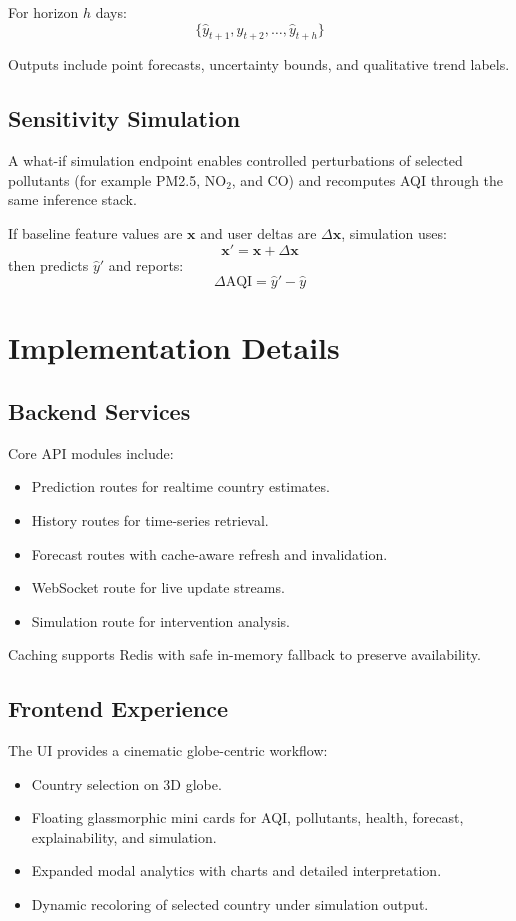 \documentclass[12pt,a4paper]{article}
\begin{document}
For horizon $h$ days:
\begin{equation}
\{\hat{y}_{t+1}, \hat{y}_{t+2}, \dots, \hat{y}_{t+h}\}
\end{equation}

Outputs include point forecasts, uncertainty bounds, and qualitative trend labels.

\subsection{Sensitivity Simulation}
A what-if simulation endpoint enables controlled perturbations of selected pollutants (for example PM2.5, NO$_2$, and CO) and recomputes AQI through the same inference stack.

If baseline feature values are $\mathbf{x}$ and user deltas are $\Delta\mathbf{x}$, simulation uses:
\begin{equation}
\mathbf{x}' = \mathbf{x} + \Delta\mathbf{x}
\end{equation}
then predicts $\hat{y}'$ and reports:
\begin{equation}
\Delta\text{AQI} = \hat{y}' - \hat{y}
\end{equation}

\section{Implementation Details}
\subsection{Backend Services}
Core API modules include:
\begin{itemize}[leftmargin=*]
    \item Prediction routes for realtime country estimates.
    \item History routes for time-series retrieval.
    \item Forecast routes with cache-aware refresh and invalidation.
    \item WebSocket route for live update streams.
    \item Simulation route for intervention analysis.
\end{itemize}

Caching supports Redis with safe in-memory fallback to preserve availability.

\subsection{Frontend Experience}
The UI provides a cinematic globe-centric workflow:
\begin{itemize}[leftmargin=*]
    \item Country selection on 3D globe.
    \item Floating glassmorphic mini cards for AQI, pollutants, health, forecast, explainability, and simulation.
    \item Expanded modal analytics with charts and detailed interpretation.
    \item Dynamic recoloring of selected country under simulation output.
\end{itemize}
\end{document}
